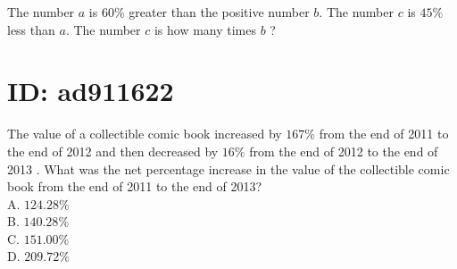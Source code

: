 The number $a$ is $60 \%$ greater than the positive number $b$. The number $c$ is $45 \%$ less than $a$. The number $c$ is how many times $b$ ?

\section*{ID: ad911622}
The value of a collectible comic book increased by $167 \%$ from the end of 2011 to the end of 2012 and then decreased by $16 \%$ from the end of 2012 to the end of 2013 . What was the net percentage increase in the value of the collectible comic book from the end of 2011 to the end of 2013?\\
A. $124.28 \%$\\
B. $140.28 \%$\\
C. $151.00 \%$\\
D. $209.72 \%$


